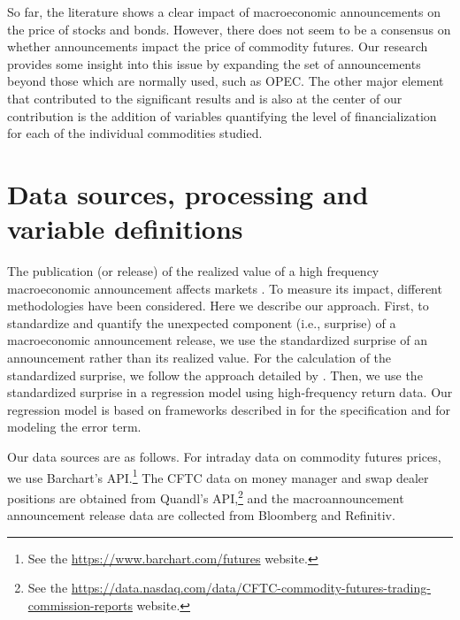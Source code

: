 \documentclass[12pt]{article}
\begin{document}
So far, the literature shows a clear impact of macroeconomic announcements on the price of stocks and bonds. However, there does not seem to be a consensus on whether announcements impact the price of commodity futures. Our research provides some insight into this issue by expanding the set of announcements beyond those which are normally used, such as OPEC. The other major element that contributed to the significant results and is also at the center of our contribution is the addition of variables quantifying the level of financialization for each of the individual commodities studied.




\section{Data sources, processing and variable definitions}
The publication (or release) of the realized value of a high frequency macroeconomic announcement affects markets \citep*{andersen1998deutsche}. To measure its impact, different methodologies have been considered.
 Here we describe our approach.  First,  to standardize and quantify the unexpected component (i.e., surprise) of a macroeconomic announcement release, we use the standardized surprise of an announcement rather than its realized value. For the calculation of the standardized surprise, we follow the approach detailed by \citet*{balduzzi2001economic}. Then, we use the standardized surprise in a regression model using high-frequency return data. Our regression model is based on frameworks described in \citet*{andersen2007real} for the specification and \citet*{kurov2019price} for modeling the error term.

Our data sources are as follows. For intraday data on commodity futures prices, we use Barchart's API.\footnote{ See the \url{https://www.barchart.com/futures} website.} The CFTC data on money manager and swap dealer positions are obtained from Quandl's API,\footnote{See the \url{https://data.nasdaq.com/data/CFTC-commodity-futures-trading-commission-reports} website.} and the macroannouncement announcement release data are collected from Bloomberg and Refinitiv.
\end{document}
